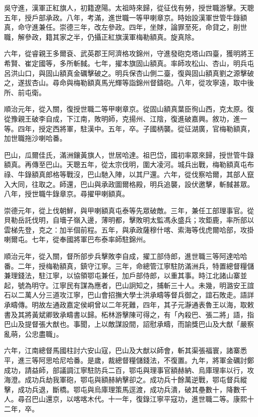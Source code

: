 \begin{pinyinscope}
吳守進，漢軍正紅旗人，初籍遼陽。太祖時來歸，從征伐有勞，授世職游擊。天聰五年，授戶部承政。八年，考滿，進世職一等甲喇章京。時始設漢軍世管牛錄額真，命守進兼任。崇德三年，改左參政。四年，坐賕，論罪至死，命貸之，削世職，解參政，籍其家之半，仍攝正紅旗漢軍梅勒額真。旋真除。

六年，從睿親王多爾袞、武英郡王阿濟格攻錦州，守進發砲克塔山四臺，獲明將王希賢、崔定國等，多所斬馘。七年，擢本旗固山額真。率師攻松山、杏山，明兵屯呂洪山口，與固山額真金礪擊破之。明兵保杏山側二臺，復與固山額真劉之源擊破之，遂拔杏山。尋命與梅勒額真馬光輝等詣錦州督鑄砲。八年，從攻寧遠，取中後所、前屯衛。

順治元年，從入關，復授世職二等甲喇章京。從固山額真葉臣徇山西，克太原。復從豫親王破李自成，下江南，敗明師，克揚州、江陰，復進破嘉興。敘功，進一等。四年，授定西將軍，駐漢中。五年，卒。子國柄襲。從征湖廣，官梅勒額真，加世職拖沙喇哈番。

巴山，瓜爾佳氏，滿洲鑲黃旗人，世居哈達。祖巴岱，國初率眾來歸，授世管牛錄額真。再傳至巴山。天聰五年，從太宗伐明，圍大凌河。城兵出戰，梅勒額真屯布祿、牛錄額真郎格等戰沒，巴山馳入陣，以其尸還。六年，從伐察哈爾，其部人竄入大同，往取之。師還，巴山與承政圖爾格殿，明兵追襲，設伏邀擊，斬馘甚眾。八年，授世職牛錄章京。尋擢甲喇額真。

崇德元年，從上伐朝鮮，與甲喇額真屯泰等先眾破敵。三年，兼任工部理事官。從貝勒岳託伐明，自墻子嶺入邊，薄明都，擊敗明太監馮永盛兵；攻鉅鹿，率所部以雲梯先登，克之：加半個前程。五年，與承政薩穆什喀、索海等伐虎爾哈部，攻掛喇爾屯。七年，從奉國將軍巴布泰率師駐錦州。

順治元年，從入關，督所部步兵擊敗李自成，擢工部侍郎，進世職三等阿達哈哈番。二年，授梅勒額真，鎮守江寧。三年，命總管江寧駐防滿洲兵，特置總督糧儲兼理錢法，駐江寧，以協領鄂屯兼任，加戶部侍郎，以重其事。時江北諸山寨並起，號為明守。江寧民有謀為應者，巴山詗知之，捕斬三十人。未幾，明潞安王誼石以二萬人分三道攻江寧，巴山會招撫大學士洪承疇等督兵御之，誼石敗走。語詳承疇傳。明故左通政嘉定侯峒曾以二年死難，四年，其子元瀞通表魯王以海，取敕書及其將黃斌卿致承疇書以歸。柘林游擊陳可得之，有「內殺巴、張二將」語，指巴山及提督張大猷也。事聞，上以敵謀設間，詔慰承疇，而諭獎巴山及大猷「嚴察亂萌，公忠盡職」。

六年，江南總督馬國柱討六安山寇，巴山及大猷以師會，斬其渠張福寰，諸寨悉平，進三等阿思哈尼哈番。是歲，裁總督糧儲錢法，不復置。九年，將軍金礪討鄭成功，請益師，部議調江寧駐防兵二百，鄂屯與理事官額赫納、烏庫理率以行，攻海澄。成功兵劫我軍砲，鄂屯與額赫納擊卻之。成功兵十餘萬逆戰，鄂屯督兵縱擊，成功兵退，斷橋。鄂屯與烏庫理策馬逕渡，成功兵潰，破其壘數十，降數千人。尋召巴山還京，以喀喀木代。十一年，復錄江寧平寇功，進世職二等。康熙十二年，卒。


\end{pinyinscope}
